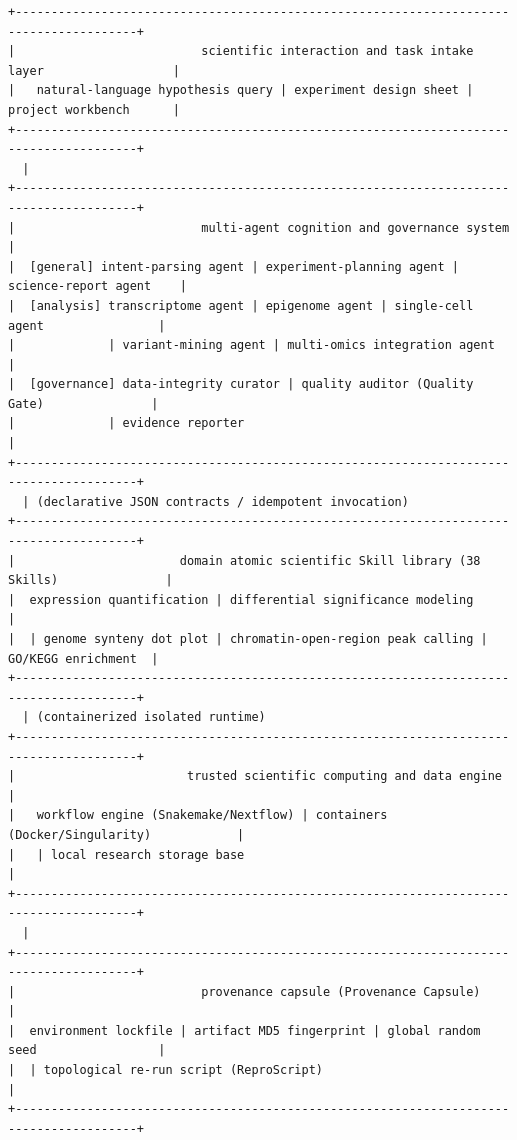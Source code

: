 \documentclass[11pt,a4paper]{article}
\begin{document}
\begin{verbatim}
+---------------------------------------------------------------------------------------+
|                          scientific interaction and task intake layer                  |
|   natural-language hypothesis query | experiment design sheet | project workbench      |
+---------------------------------------------------------------------------------------+
  |
+---------------------------------------------------------------------------------------+
|                          multi-agent cognition and governance system                  |
|  [general] intent-parsing agent | experiment-planning agent | science-report agent    |
|  [analysis] transcriptome agent | epigenome agent | single-cell agent                |
|             | variant-mining agent | multi-omics integration agent                    |
|  [governance] data-integrity curator | quality auditor (Quality Gate)               |
|             | evidence reporter                                                        |
+---------------------------------------------------------------------------------------+
  | (declarative JSON contracts / idempotent invocation)
+---------------------------------------------------------------------------------------+
|                       domain atomic scientific Skill library (38 Skills)               |
|  expression quantification | differential significance modeling                       |
|  | genome synteny dot plot | chromatin-open-region peak calling | GO/KEGG enrichment  |
+---------------------------------------------------------------------------------------+
  | (containerized isolated runtime)
+---------------------------------------------------------------------------------------+
|                        trusted scientific computing and data engine                    |
|   workflow engine (Snakemake/Nextflow) | containers (Docker/Singularity)            |
|   | local research storage base                                                       |
+---------------------------------------------------------------------------------------+
  |
+---------------------------------------------------------------------------------------+
|                          provenance capsule (Provenance Capsule)                       |
|  environment lockfile | artifact MD5 fingerprint | global random seed                 |
|  | topological re-run script (ReproScript)                                           |
+---------------------------------------------------------------------------------------+
\end{verbatim}
\end{document}
